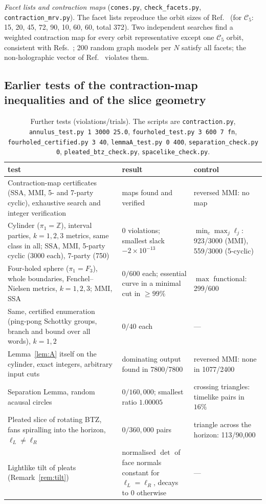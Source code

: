 \documentclass[aps,prd,onecolumn,superscriptaddress,nofootinbib,amsmath,amssymb,11pt]{revtex4-2}
\theoremstyle{definition}
\newcommand{\Z}{\mathbb{Z}}
\begin{document}
\emph{Facet lists and contraction maps} (\texttt{cones.py}, \texttt{check\_facets.py}, \texttt{contraction\_mrv.py}). The facet lists
reproduce the orbit sizes of Ref.~\cite{AvisHernandezCuenca2023} (for $\mathcal C_5$: 15, 20, 45, 72, 90, 10, 60, 60, total 372). Two
independent searches find a weighted contraction map for every orbit representative except one $\mathcal C_5$ orbit, consistent with
Refs.~\cite{AvisHernandezCuenca2023,GHHS2026}; 200 random graph models per $N$ satisfy all facets; the non-holographic vector of
Ref.~\cite{Bao2015} violates them.

\subsection{Earlier tests of the contraction-map inequalities and of the slice geometry}

\begin{table}[h]
\caption{Further tests (violations/trials). The scripts are \texttt{contraction.py}, \texttt{annulus\_test.py 1 3000 25.0},
\texttt{fourholed\_test.py 3 600 7 fn}, \texttt{fourholed\_certified.py 3 40}, \texttt{lemmaA\_test.py 0 400},
\texttt{separation\_check.py 0}, \texttt{pleated\_btz\_check.py}, \texttt{spacelike\_check.py}.}
\label{tab:earlier}
\begin{ruledtabular}
\begin{tabular}{p{}p{}p{}}
test & result & control\\
\hline
Contraction-map certificates (SSA, MMI, 5- and 7-party cyclic), exhaustive search and integer verification & maps found and verified & reversed MMI: no map\\
Cylinder ($\pi_1=\Z$), interval parties, $k=1,2,3$ metrics, same class in all; SSA, MMI, 5-party cyclic (3000 each), 7-party (750) & $0$ violations; smallest slack $-2\times10^{-13}$ & $\min_c\max_j\ell_j$: 923/3000 (MMI), 559/3000 (5-cyclic)\\
Four-holed sphere ($\pi_1=F_3$), whole boundaries, Fenchel--Nielsen metrics, $k=1,2,3$; MMI, SSA & $0/600$ each; essential curve in a minimal cut in $\ge99\%$ & $\max$ functional: 299/600\\
Same, certified enumeration (ping-pong Schottky groups, branch and bound over all words), $k=1,2$ & $0/40$ each & ---\\
Lemma~\ref{lem:A} itself on the cylinder, exact integers, arbitrary input cuts & dominating output found in 7800/7800 & reversed MMI: none in 1077/2400\\
Separation Lemma, random acausal circles & $0/160{,}000$; smallest ratio $1.00005$ & crossing triangles: timelike pairs in $16\%$\\
Pleated slice of rotating BTZ, fans spiralling into the horizon, $\ell_L\ne\ell_R$ & $0/360{,}000$ pairs & triangle across the horizon: 113/90,000\\
Lightlike tilt of pleats (Remark~\ref{rem:tilt}) & normalised $\det$ of face normals constant for $\ell_L=\ell_R$, decays to $0$ otherwise & ---\\
\end{tabular}
\end{ruledtabular}
\end{table}
\end{document}
